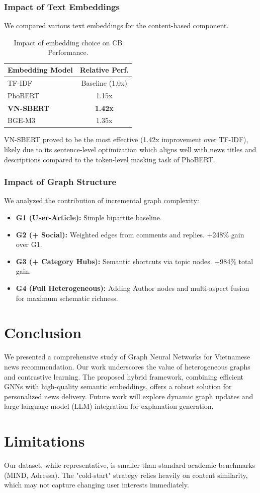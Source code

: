 \documentclass[11pt]{article}
\begin{document}
\subsubsection{Impact of Text Embeddings}
We compared various text embeddings for the content-based component.
\begin{table}[h]
    \centering
    \small
    \begin{tabular}{lc}
        \hline
        \textbf{Embedding Model} & \textbf{Relative Perf.} \\
        \hline
        TF-IDF                   & Baseline (1.0x)         \\
        PhoBERT                  & 1.15x                   \\
        \textbf{VN-SBERT}        & \textbf{1.42x}          \\
        BGE-M3                   & 1.35x                   \\
        \hline
    \end{tabular}
    \caption{Impact of embedding choice on CB Performance.}
    \label{tab:embeddings}
\end{table}
VN-SBERT proved to be the most effective (1.42x improvement over TF-IDF), likely due to its sentence-level optimization which aligns well with news titles and descriptions compared to the token-level masking task of PhoBERT.

\subsubsection{Impact of Graph Structure}
We analyzed the contribution of incremental graph complexity:
\begin{itemize}
    \item \textbf{G1 (User-Article):} Simple bipartite baseline.
    \item \textbf{G2 (+ Social):} Weighted edges from comments and replies. +248\% gain over G1.
    \item \textbf{G3 (+ Category Hubs):} Semantic shortcuts via topic nodes. +984\% total gain.
    \item \textbf{G4 (Full Heterogeneous):} Adding Author nodes and multi-aspect fusion for maximum schematic richness.
\end{itemize}

\section{Conclusion}
We presented a comprehensive study of Graph Neural Networks for Vietnamese news recommendation. Our work underscores the value of heterogeneous graphs and contrastive learning. The proposed hybrid framework, combining efficient GNNs with high-quality semantic embeddings, offers a robust solution for personalized news delivery. Future work will explore dynamic graph updates and large language model (LLM) integration for explanation generation.

\section*{Limitations}
Our dataset, while representative, is smaller than standard academic benchmarks (MIND, Adressa). The "cold-start" strategy relies heavily on content similarity, which may not capture changing user interests immediately.


\end{document}
